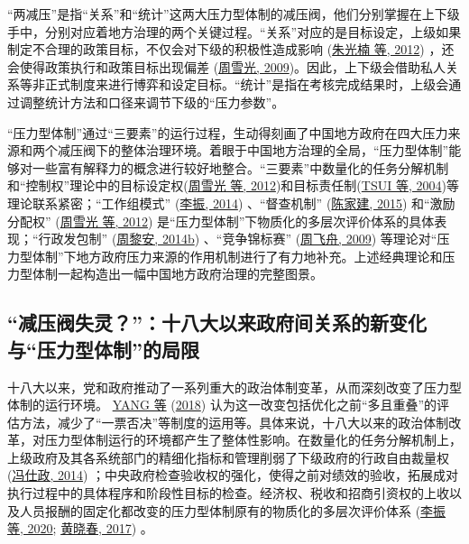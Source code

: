 \documentclass[
  12pt,
]{ctexart}
\begin{document}
``两减压''是指``关系''和``统计''这两大压力型体制的减压阀，他们分别掌握在上下级手中，分别对应着地方治理的两个关键过程。``关系''对应的是目标设定，上级如果制定不合理的政策目标，不仅会对下级的积极性造成影响 (\protect\hyperlink{ref-ZhuGuangNanEtAl2012}{朱光楠 等, 2012}) ，还会使得政策执行和政策目标出现偏差 (\protect\hyperlink{ref-ZhouXueGuang2009}{周雪光, 2009})。因此，上下级会借助私人关系等非正式制度来进行博弈和设定目标。``统计''是指在考核完成结果时，上级会通过调整统计方法和口径来调节下级的``压力参数''。

``压力型体制''通过``三要素''的运行过程，生动得刻画了中国地方政府在四大压力来源和两个减压阀下的整体治理环境。着眼于中国地方治理的全局，``压力型体制''能够对一些富有解释力的概念进行较好地整合。``三要素''中数量化的任务分解机制和``控制权''理论中的目标设定权(\protect\hyperlink{ref-ZhouXueGuangLianHong2012}{周雪光 等, 2012})和目标责任制(\protect\hyperlink{ref-TsuiWang2004}{TSUI 等, 2004})等理论联系紧密；``工作组模式'' (\protect\hyperlink{ref-LiZhen2014}{李振, 2014}) 、``督查机制'' (\protect\hyperlink{ref-ChenJiaJian2015}{陈家建, 2015}) 和``激励分配权'' (\protect\hyperlink{ref-ZhouXueGuangLianHong2012}{周雪光 等, 2012}) 是``压力型体制''下物质化的多层次评价体系的具体表现；``行政发包制'' (\protect\hyperlink{ref-ZhouLiAn2014a}{周黎安, 2014b}) 、``竞争锦标赛'' (\protect\hyperlink{ref-ZhouFeiZhou2009}{周飞舟, 2009}) 等理论对``压力型体制''下地方政府压力来源的作用机制进行了有力地补充。上述经典理论和压力型体制一起构造出一幅中国地方政府治理的完整图景。

\hypertarget{ux51cfux538bux9600ux5931ux7075ux5341ux516bux5927ux4ee5ux6765ux653fux5e9cux95f4ux5173ux7cfbux7684ux65b0ux53d8ux5316ux4e0eux538bux529bux578bux4f53ux5236ux7684ux5c40ux9650}{%
\subsection{``减压阀失灵？''：十八大以来政府间关系的新变化与``压力型体制''的局限}\label{ux51cfux538bux9600ux5931ux7075ux5341ux516bux5927ux4ee5ux6765ux653fux5e9cux95f4ux5173ux7cfbux7684ux65b0ux53d8ux5316ux4e0eux538bux529bux578bux4f53ux5236ux7684ux5c40ux9650}}

十八大以来，党和政府推动了一系列重大的政治体制变革，从而深刻改变了压力型体制的运行环境。 \protect\hyperlink{ref-YangYan2018}{YANG 等} (\protect\hyperlink{ref-YangYan2018}{2018}) 认为这一改变包括优化之前``多且重叠''的评估方法，减少了``一票否决''等制度的运用等。具体来说，十八大以来的政治体制改革，对压力型体制运行的环境都产生了整体性影响。在数量化的任务分解机制上，上级政府及其各系统部门的精细化指标和管理削弱了下级政府的行政自由裁量权 (\protect\hyperlink{ref-FengShiZheng2014}{冯仕政, 2014}) ；中央政府检查验收权的强化，使得之前对绩效的验收，拓展成对执行过程中的具体程序和阶段性目标的检查。经济权、税收和招商引资权的上收以及人员报酬的固定化都改变的压力型体制原有的物质化的多层次评价体系 (\protect\hyperlink{ref-LiZhenEtAl2020}{李振 等, 2020}; \protect\hyperlink{ref-HuangXiaoChun2017}{黄晓春, 2017}) 。
\end{document}
